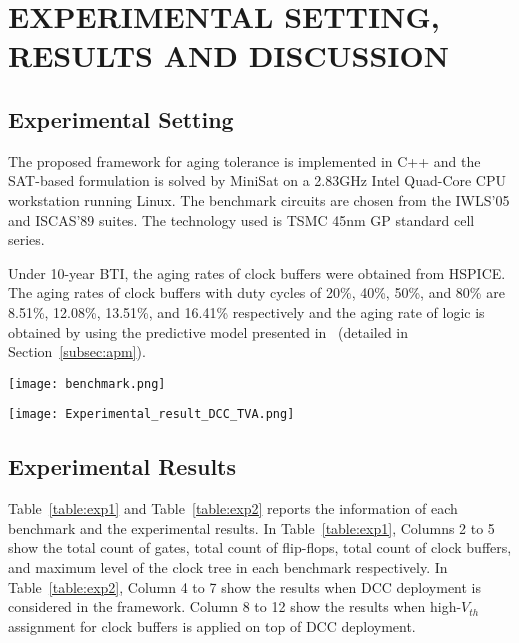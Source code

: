 \section{EXPERIMENTAL SETTING, RESULTS AND DISCUSSION}
\label{sec:exp}
\subsection{Experimental Setting}
The proposed framework for aging tolerance is implemented in C++ and the SAT-based formulation is solved by MiniSat on a 2.83GHz Intel Quad-Core CPU workstation running Linux. The benchmark circuits are chosen from the IWLS'05 and ISCAS'89 suites. The technology used is TSMC 45nm GP standard cell series.

Under 10-year BTI, the aging rates of clock buffers were obtained from HSPICE. The aging rates of clock buffers with duty cycles of 20\%, 40\%, 50\%, and 80\% are 8.51\%, 12.08\%, 13.51\%, and 16.41\% respectively and the aging rate of logic is obtained by using the predictive model presented in~\cite{wang2010impact, wang2007efficient, gomez2016early} (detailed in Section~\ref{subsec:apm}).


\begin{table*}
\centering
\caption{Benchmark information}
	\texttt{[image: benchmark.png]} %
\label{table:exp1}
\end{table*}
\begin{table*}
\centering
\caption{Results of aging tolerance}
	\texttt{[image: Experimental\_result\_DCC\_TVA.png]} %
\label{table:exp2}
\end{table*}
\subsection{Experimental Results}
Table~\ref{table:exp1} and Table~\ref{table:exp2} reports the information of each benchmark and the experimental results. In Table~\ref{table:exp1}, Columns 2 to 5 show the total count of gates, total count of flip-flops, total count of clock buffers, and maximum level of the clock tree in each benchmark respectively. In Table~\ref{table:exp2}, Column 4 to 7 show the results when DCC deployment is considered in the framework. Column 8 to 12 show the results when high-$V_{th}$ assignment for clock buffers is applied on top of DCC deployment.

